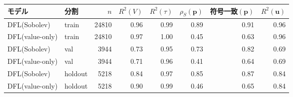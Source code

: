 \begin{tabular}{llrrrrrr}
\toprule
モデル & 分割 & $n$ & $R^2(V)$ & $R^2(\tau)$ & $\rho_S(\bm p)$ & 符号一致$(\bm p)$ & $R^2(\bm u)$ \\
\midrule
DFL(Sobolev) & train & 24810 & 0.96 & 0.99 & 0.89 & 0.91 & 0.96 \\
DFL(value-only) & train & 24810 & 0.97 & 1.00 & 0.45 & 0.63 & 0.96 \\
DFL(Sobolev) & val & 3944 & 0.73 & 0.95 & 0.73 & 0.82 & 0.69 \\
DFL(value-only) & val & 3944 & 0.71 & 0.96 & 0.41 & 0.64 & 0.69 \\
DFL(Sobolev) & holdout & 5218 & 0.84 & 0.97 & 0.85 & 0.87 & 0.84 \\
DFL(value-only) & holdout & 5218 & 0.90 & 0.99 & 0.46 & 0.65 & 0.84 \\
\bottomrule
\end{tabular}
